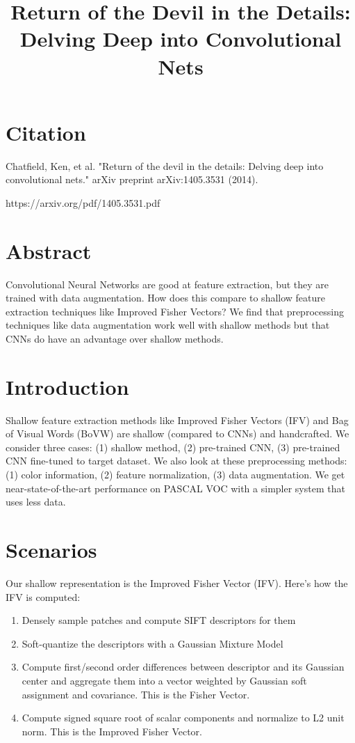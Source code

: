 \documentclass[a4paper]{article}
\title{Return of the Devil in the Details:
Delving Deep into Convolutional Nets}
\date{}
\begin{document}
\maketitle

\section{Citation}

Chatfield, Ken, et al. "Return of the devil in the details: Delving deep into convolutional nets." arXiv preprint arXiv:1405.3531 (2014).

https://arxiv.org/pdf/1405.3531.pdf

\section{Abstract}
Convolutional Neural Networks are good at feature extraction, but they are
trained with data augmentation. How does this compare to shallow feature
extraction techniques like Improved Fisher Vectors? We find that preprocessing
techniques like data augmentation work well with shallow methods but that
CNNs do have an advantage over shallow methods.

\section{Introduction}
Shallow feature extraction methods like Improved Fisher Vectors (IFV) and
Bag of Visual Words (BoVW) are shallow (compared to CNNs) and handcrafted. We
consider three cases: (1) shallow method, (2) pre-trained CNN, (3) pre-trained
CNN fine-tuned to target dataset. We also look at these preprocessing methods:
(1) color information, (2) feature normalization, (3) data augmentation. We get
near-state-of-the-art performance on PASCAL VOC with a simpler system that uses
less data.

\section{Scenarios}
Our shallow representation is the Improved Fisher Vector (IFV). Here's how the
IFV is computed:

\begin{enumerate}
  \item Densely sample patches and compute SIFT descriptors for them
  \item Soft-quantize the descriptors with a Gaussian Mixture Model
  \item Compute first/second order differences between descriptor and its
    Gaussian center and aggregate them into a vector weighted by Gaussian
    soft assignment and covariance. This is the Fisher Vector.
  \item Compute signed square root of scalar components and normalize to L2
    unit norm. This is the Improved Fisher Vector.
\end{enumerate}
\end{document}

